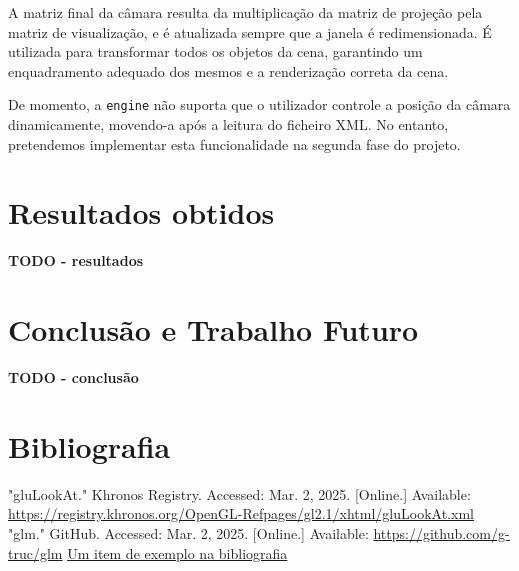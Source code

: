 \documentclass[12pt, a4paper]{article}
\begin{document}
A matriz final da câmara resulta da multiplicação da matriz de projeção pela matriz de visualização,
e é atualizada sempre que a janela é redimensionada. É utilizada para transformar todos os objetos
da cena, garantindo um enquadramento adequado dos mesmos e a renderização correta da cena.

De momento, a \texttt{engine} não suporta que o utilizador controle a posição da câmara
dinamicamente, movendo-a após a leitura do ficheiro XML. No entanto, pretendemos implementar esta
funcionalidade na segunda fase do projeto.

\section{Resultados obtidos}

\textbf{\color{red} TODO - resultados}

\section{Conclusão e Trabalho Futuro}

\textbf{\color{red} TODO - conclusão}

\begingroup
\section{Bibliografia}
\renewcommand{\section}[2]{}

\begin{thebibliography}{9}
        "gluLookAt."{} Khronos Registry. Accessed: Mar. 2, 2025. [Online.] Available:
        \url{https://registry.khronos.org/OpenGL-Refpages/gl2.1/xhtml/gluLookAt.xml}
        "glm."{} GitHub. Accessed: Mar. 2, 2025. [Online.] Available:
        \url{https://github.com/g-truc/glm}
        \href{https://youtu.be/dQw4w9WgXcQ}{Um item de exemplo na bibliografia}
\end{thebibliography}
\endgroup
\end{document}
